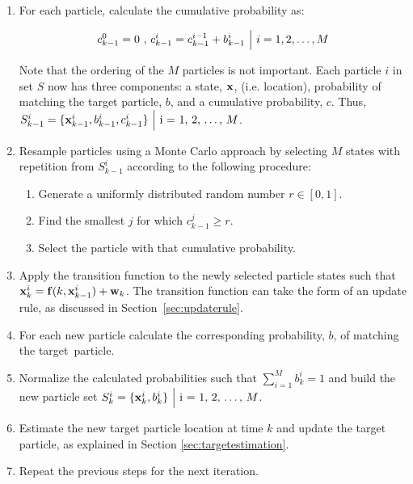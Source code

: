 \documentclass[11pt]{article}
\begin{document}
\begin{enumerate}

\item{For each particle, calculate the cumulative probability as:

\begin{equation}
c^0_{k-1} = 0 \text{ , } c^i_{k-1} = c^{i-1}_{k-1} + b^i_{k-1} \text{ } \Bigl \vert \text{ } i = 1, 2, \dots, M
\label{eq:bprob}
\end{equation}

Note that the ordering of the $M$ particles is not important. Each particle $i$ in set $S$ now has three components: a state, ${\bf x}$, (i.e. location), probability of matching the target particle, $b$, and a cumulative probability, $c$. Thus, $S^i_{k-1} = \{ {\bf x}^i_{k-1}, b^i_{k-1}, c^i_{k-1} \} \text{ } \Bigl \vert \text{ } \mbox{i = 1, 2, \dots, $M$}$.
}

\item{Resample particles using a Monte Carlo approach by selecting $M$ states with repetition from $S^i_{k-1}$ according to the following procedure:

\begin{enumerate}
\item{Generate a uniformly distributed random number $r \in [0,1]$.}
\item{Find the smallest $j$ for which $c^j_{k-1} \geq r$.}
\item{Select the particle with that cumulative probability.}
\end{enumerate}
}

\item{Apply the transition function to the newly selected particle states such that ${\bf x}^i_k = {\bf f}(k,{\bf x}^i_{k-1}) + {\bf w}_k$. The transition function can take the form of an update rule, as discussed in Section~\ref{sec:updaterule}.}

\item{For each new particle calculate the corresponding probability, $b$, of matching the \mbox{target~particle.}}

\item{Normalize the calculated probabilities such that $\sum^M_{i=1}b^i_k = 1$ and build the new particle set $S^i_{k} = \{ {\bf x}^i_k, b^i_k \} \text{ } \Bigl \vert \text{ } \mbox{i = 1, 2, \dots, $M$}$.}

\item{Estimate the new target particle location at time $k$ and update the target particle, as explained in Section \ref{sec:targetestimation}.}

\item{Repeat the previous steps for the next iteration.}

\end{enumerate}
\end{document}
